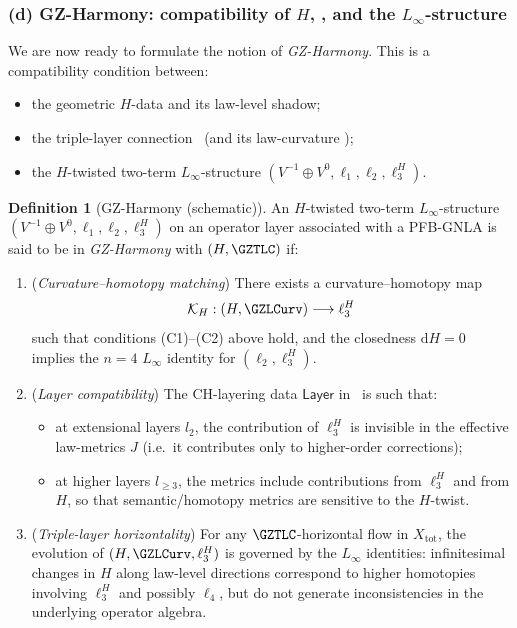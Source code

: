 \documentclass[11pt]{book}
\theoremstyle{plain}
\theoremstyle{definition}
\newtheorem{definition}[theorem]{Definition} \theoremstyle{remark}
\begin{document}
\subsubsection*{(d) GZ-Harmony: compatibility of $H$, \GZTLC, and the $L_\infty$-structure}

We are now ready to formulate the notion of \emph{GZ-Harmony}. This is a
compatibility condition between:

\begin{itemize}
  \item the geometric $H$-data and its law-level shadow;
  \item the triple-layer connection \GZTLC\ (and its law-curvature
        \GZLCurv);
  \item the $H$-twisted two-term $L_\infty$-structure
        $(V^{-1}\oplus V^0,\ell_1,\ell_2,\ell_3^H)$.
\end{itemize}

\begin{definition}[GZ-Harmony (schematic)]
An $H$-twisted two-term $L_\infty$-structure
  $(V^{-1}\oplus V^0,\ell_1,\ell_2,\ell_3^H)$ on an operator layer
  associated with a PFB-GNLA is said to be in \emph{GZ-Harmony} with
  $(H,\GZTLC)$ if:
  \begin{enumerate}[label=\roman*)]
    \item (\emph{Curvature–homotopy matching})
          There exists a curvature–homotopy map
          \[
             \mathcal{K}_H:
               (H,\GZLCurv)
               \longrightarrow
               \ell_3^H
          \]
          such that conditions (C1)–(C2) above hold, and the closedness
          $\mathrm{d}H=0$ implies the $n=4$ $L_\infty$ identity for
          $(\ell_2,\ell_3^H)$.
    \item (\emph{Layer compatibility})
          The CH-layering data $\mathsf{Layer}$ in \GZGMS\ is such that:
          \begin{itemize}
            \item at extensional layers $l_2$, the contribution of
                  $\ell_3^H$ is invisible in the effective law-metrics
                  $J$ (i.e.\ it contributes only to higher-order
                  corrections);
            \item at higher layers $l_{\ge3}$, the metrics include
                  contributions from $\ell_3^H$ and from $H$, so that
                  semantic/homotopy metrics are sensitive to the
                  $H$-twist.
          \end{itemize}
    \item (\emph{Triple-layer horizontality})
          For any $\GZTLC$-horizontal flow in $X_{\mathrm{tot}}$, the
          evolution of $(H,\GZLCurv,\ell_3^H)$ is governed by the
          $L_\infty$ identities: infinitesimal changes in $H$ along
          law-level directions correspond to higher homotopies
          involving $\ell_3^H$ and possibly $\ell_4$, but do not
          generate inconsistencies in the underlying operator algebra.
  \end{enumerate}
\end{definition}
\end{document}
